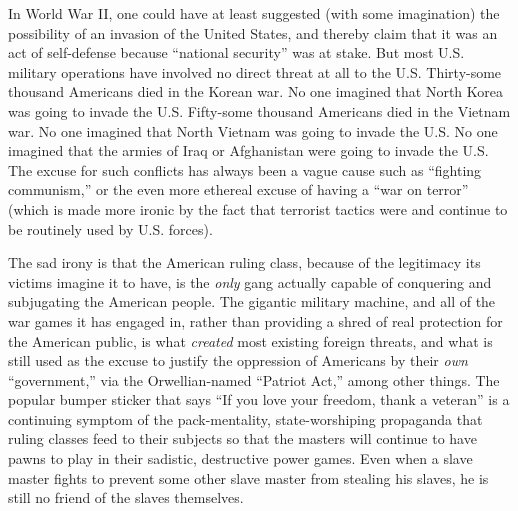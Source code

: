 \documentclass{book}
\begin{document}
In World War II, one could have at least suggested (with some imagination) the possibility of an invasion of the United States, and thereby claim that it was an act of self-defense because \enquote{national security} was at stake. But most U.S. military operations have involved no direct threat at all to the U.S. Thirty-some thousand Americans died in the Korean war. No one imagined that North Korea was going to invade the U.S. Fifty-some thousand Americans died in the Vietnam war. No one imagined that North Vietnam was going to invade the U.S. No one imagined that the armies of Iraq or Afghanistan were going to invade the U.S. The excuse for such conflicts has always been a vague cause such as \enquote{fighting communism,} or the even more ethereal excuse of having a \enquote{war on terror} (which is made more ironic by the fact that terrorist tactics were and continue to be routinely used by U.S. forces).

The sad irony is that the American ruling class, because of the legitimacy its victims imagine it to have, is the \emph{only} gang actually capable of conquering and subjugating the American people. The gigantic military machine, and all of the war games it has engaged in, rather than providing a shred of real protection for the American public, is what \emph{created} most existing foreign threats, and what is still used as the excuse to justify the oppression of Americans by their \emph{own} \enquote{government,} via the Orwellian-named \enquote{Patriot Act,} among other things. The popular bumper sticker that says \enquote{If you love your freedom, thank a veteran} is a continuing symptom of the pack-mentality, state-worshiping propaganda that ruling classes feed to their subjects so that the masters will continue to have pawns to play in their sadistic, destructive power games. Even when a slave master fights to prevent some other slave master from stealing his slaves, he is still no friend of the slaves themselves.
\end{document}
